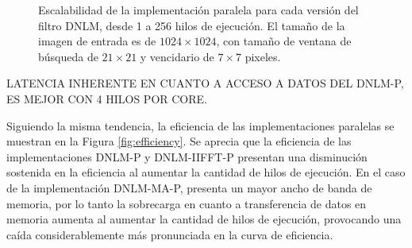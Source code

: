 \begin{figure}
\centering
  \caption[Escalabilidad de las implementaciones paralelas del filtro DNLM]{Escalabilidad de la implementación paralela para cada versión del filtro DNLM, desde 1 a 256 hilos de ejecución. El tama\~no de la imagen de entrada es de $1024\times1024$, con tama\~no de ventana de búsqueda de $21 \times 21$ y vencidario de $7 \times 7$ pixeles.\label{fig:scalability}}
  \end{figure}
  
  LATENCIA INHERENTE EN CUANTO A ACCESO A DATOS DEL DNLM-P, ES MEJOR CON 4 HILOS POR CORE.
  
  
  Siguiendo la misma tendencia, la eficiencia de las implementaciones paralelas se muestran en la Figura \ref{fig:efficiency}. Se aprecia que la eficiencia de las implementaciones DNLM-P y DNLM-IIFFT-P presentan una disminución sostenida en la eficiencia al aumentar la cantidad de hilos de ejecución. En el caso de la implementación DNLM-MA-P, presenta un mayor ancho de banda de memoria, por lo tanto la sobrecarga en cuanto a transferencia de datos en memoria aumenta al aumentar la cantidad de hilos de ejecución, provocando una caída considerablemente más pronunciada en la curva de eficiencia.
  
